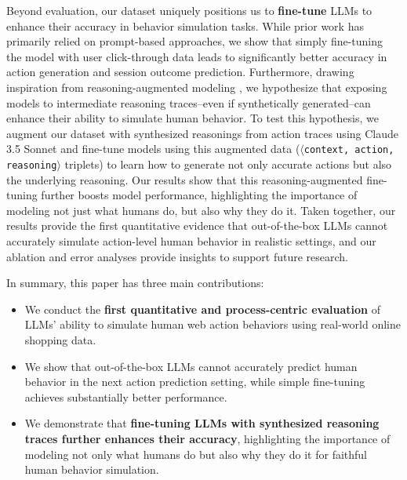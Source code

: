 \documentclass{article} %
\begin{document}
Beyond evaluation, our dataset uniquely positions us to \textbf{fine-tune} LLMs to enhance their accuracy in behavior simulation tasks. 
While prior work has primarily relied on prompt-based approaches, we show that simply fine-tuning the model with user click-through data leads to significantly better accuracy in action generation and session outcome prediction.
Furthermore, drawing inspiration from reasoning-augmented modeling \cite{deepseek-aiDeepSeekR1IncentivizingReasoning2025}, we hypothesize that exposing models to intermediate reasoning traces--even if synthetically generated--can enhance their ability to simulate human behavior.
To test this hypothesis, we augment our dataset with synthesized reasonings from action traces using Claude 3.5 Sonnet and fine-tune models using this augmented data (\texttt{$\langle$context, action, reasoning$\rangle$} triplets) to learn how to generate not only accurate actions but also the underlying reasoning.
Our results show that this reasoning-augmented fine-tuning further boosts model performance, highlighting the importance of modeling not just what humans do, but also why they do it.
Taken together, our results provide the first quantitative evidence that out-of-the-box LLMs cannot accurately simulate action-level human behavior in realistic settings, and our ablation and error analyses provide insights to support future research.

In summary, this paper has three main contributions:

\begin{itemize}
    \item We conduct the \textbf{first quantitative and process-centric evaluation} of LLMs' ability to simulate human web action behaviors using real-world online shopping data.

    \item We show that out-of-the-box LLMs cannot accurately predict human behavior in the next action prediction setting, while simple fine-tuning achieves substantially better performance.

    \item We demonstrate that \textbf{fine-tuning LLMs with synthesized reasoning traces further enhances their accuracy}, highlighting the importance of modeling not only what humans do but also why they do it for faithful human behavior simulation.

\end{itemize}


\end{document}
